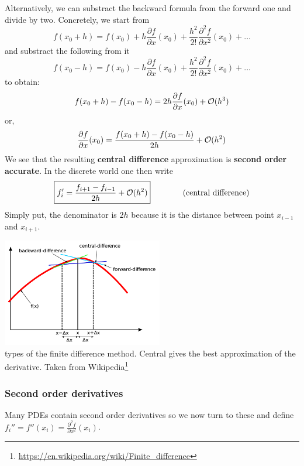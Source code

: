 


Alternatively, we can substract the backward formula from the forward one 
and divide by two. Concretely, we start from 
\[
f(x_0+h)=f(x_0)+ 
h \frac{\partial f}{\partial x}(x_0)  + 
\frac{h^2}{2!} \frac{\partial^2 f}{\partial x^2}(x_0)  + \dots  
\]
and substract the following from it
\[
f(x_0-h)=f(x_0)-
h \frac{\partial f}{\partial x}(x_0)  + 
\frac{h^2}{2!} \frac{\partial^2 f}{\partial x^2}(x_0)  + \dots 
\]
to obtain:
\[
f(x_0+h)-f(x_0-h) = 2h \frac{\partial f}{\partial x}(x_0)  +{\cal O}(h^3) 
\]
or, 
\[
\frac{\partial f}{\partial x}(x_0)  = \frac{ f(x_0+h)-f(x_0-h)}{2h} +{\cal O}(h^2) 
\]
We see that the resulting {\bf central difference} approximation is 
{\bf second order accurate}. In the discrete world one then write
\[
\boxed{
f_i' = \frac{f_{i+1}-f_{i-1}}{2h} + {\cal O}(h^2)
}
\qquad
\qquad
\text{(central difference)} 
\]
Simply put, the denominator is $2h$ because it is the distance between point $x_{i-1}$ and $x_{i+1}$.


\begin{center}
\includegraphics[width=7cm]{images/fdm/fd1}\\
{ types of the finite difference method. Central gives the best approximation of the derivative.
Taken from Wikipedia\footnote{\url{https://en.wikipedia.org/wiki/Finite_difference}}
}
\end{center}

\subsubsection{Second order derivatives}

Many PDEs contain second order derivatives so we now turn to these and 
define $f_i''=f''(x_i) = \frac{\partial^2 f}{\partial x^2} (x_i)$. 

